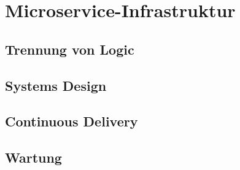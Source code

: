 \chapter{Microservice-Infrastruktur}

\section{Trennung von Logic}

\section{Systems Design}

\section{Continuous Delivery}

\section{Wartung}
